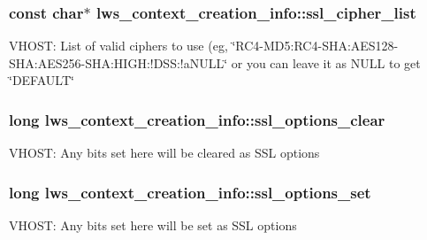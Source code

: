 \subsubsection[{\texorpdfstring{ssl\+\_\+cipher\+\_\+list}{ssl\_cipher\_list}}]{\setlength{\rightskip}{0pt plus 5cm}const char$\ast$ lws\+\_\+context\+\_\+creation\+\_\+info\+::ssl\+\_\+cipher\+\_\+list}\hypertarget{structlws__context__creation__info_a3e1516fd7fed26bfa77c0246ed26c2eb}{}\label{structlws__context__creation__info_a3e1516fd7fed26bfa77c0246ed26c2eb}
V\+H\+O\+ST\+: List of valid ciphers to use (eg, \char`\"{}\+R\+C4-\/\+M\+D5\+:\+R\+C4-\/\+S\+H\+A\+:\+A\+E\+S128-\/\+S\+H\+A\+:\+A\+E\+S256-\/\+S\+H\+A\+:\+H\+I\+G\+H\+:!\+D\+S\+S\+:!a\+N\+U\+L\+L\char`\"{} or you can leave it as N\+U\+LL to get \char`\"{}\+D\+E\+F\+A\+U\+L\+T\char`\"{} 
\subsubsection[{\texorpdfstring{ssl\+\_\+options\+\_\+clear}{ssl\_options\_clear}}]{\setlength{\rightskip}{0pt plus 5cm}long lws\+\_\+context\+\_\+creation\+\_\+info\+::ssl\+\_\+options\+\_\+clear}\hypertarget{structlws__context__creation__info_adb0bc0b28cd7d90ab306723d8ffa96fa}{}\label{structlws__context__creation__info_adb0bc0b28cd7d90ab306723d8ffa96fa}
V\+H\+O\+ST\+: Any bits set here will be cleared as S\+SL options 
\subsubsection[{\texorpdfstring{ssl\+\_\+options\+\_\+set}{ssl\_options\_set}}]{\setlength{\rightskip}{0pt plus 5cm}long lws\+\_\+context\+\_\+creation\+\_\+info\+::ssl\+\_\+options\+\_\+set}\hypertarget{structlws__context__creation__info_a704940261951ced6b5d8191bd8b9bb2d}{}\label{structlws__context__creation__info_a704940261951ced6b5d8191bd8b9bb2d}
V\+H\+O\+ST\+: Any bits set here will be set as S\+SL options 
